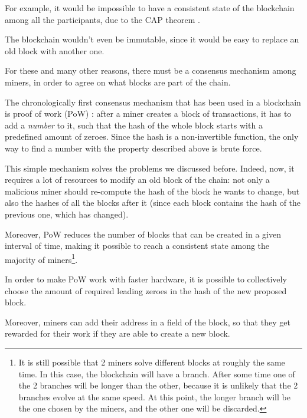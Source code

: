 \documentclass[12pt]{article}
\begin{document}
For example, it would be impossible to have a consistent state of the blockchain among all the participants, due to the CAP theorem \cite{CAP_theorem}.

The blockchain wouldn't even be immutable, since it would be easy to replace an old block with another one.

For these and many other reasons, there must be a consensus mechanism among miners, in order to agree on what blocks are part of the chain.

The chronologically first consensus mechanism that has been used in a blockchain is proof of work (PoW) \cite{bitcoin_seminal}: after a miner creates a block of transactions, it has to add a \textit{number} to it, such that the hash of the whole block starts with a predefined amount of zeroes.
Since the hash is a non-invertible function, the only way to find a number with the property described above is brute force.

This simple mechanism solves the problems we discussed before. Indeed, now, it requires a lot of resources to modify an old block of the chain: not only a malicious miner should re-compute the hash of the block he wants to change, but also the hashes of all the blocks after it (since each block contains the hash of the previous one, which has changed).

Moreover, PoW reduces the number of blocks that can be created in a given interval of time, making it possible to reach a consistent state among the majority of miners\footnote{It is still possible that 2 miners solve different blocks at roughly the same time. In this case, the blockchain will have a branch. After some time one of the 2 branches will be longer than the other, because it is unlikely that the 2 branches evolve at the same speed. At this point, the longer branch will be the one chosen by the miners, and the other one will be discarded.}.

In order to make PoW work with faster hardware, it is possible to collectively choose the amount of required leading zeroes in the hash of the new proposed block.

Moreover, miners can add their address in a field of the block, so that they get rewarded for their work if they are able to create a new block.
\end{document}
